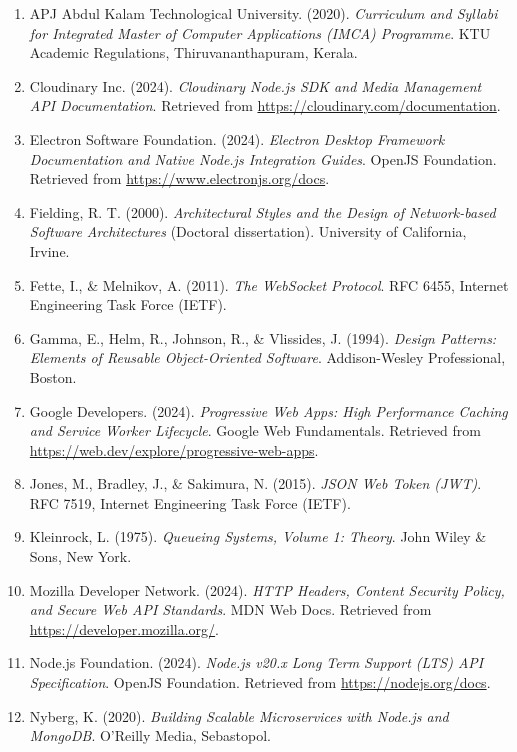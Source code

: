 \documentclass[12pt,a4paper,oneside]{report}
\begin{document}
\begin{singlespace}
\begin{enumerate}[leftmargin=0.35in, itemsep=6pt]
  \item APJ Abdul Kalam Technological University. (2020). \textit{Curriculum and Syllabi for Integrated Master of Computer Applications (IMCA) Programme}. KTU Academic Regulations, Thiruvananthapuram, Kerala.
  \item Cloudinary Inc. (2024). \textit{Cloudinary Node.js SDK and Media Management API Documentation}. Retrieved from \url{https://cloudinary.com/documentation}.
  \item Electron Software Foundation. (2024). \textit{Electron Desktop Framework Documentation and Native Node.js Integration Guides}. OpenJS Foundation. Retrieved from \url{https://www.electronjs.org/docs}.
  \item Fielding, R. T. (2000). \textit{Architectural Styles and the Design of Network-based Software Architectures} (Doctoral dissertation). University of California, Irvine.
  \item Fette, I., \& Melnikov, A. (2011). \textit{The WebSocket Protocol}. RFC 6455, Internet Engineering Task Force (IETF).
  \item Gamma, E., Helm, R., Johnson, R., \& Vlissides, J. (1994). \textit{Design Patterns: Elements of Reusable Object-Oriented Software}. Addison-Wesley Professional, Boston.
  \item Google Developers. (2024). \textit{Progressive Web Apps: High Performance Caching and Service Worker Lifecycle}. Google Web Fundamentals. Retrieved from \url{https://web.dev/explore/progressive-web-apps}.
  \item Jones, M., Bradley, J., \& Sakimura, N. (2015). \textit{JSON Web Token (JWT)}. RFC 7519, Internet Engineering Task Force (IETF).
  \item Kleinrock, L. (1975). \textit{Queueing Systems, Volume 1: Theory}. John Wiley \& Sons, New York.
  \item Mozilla Developer Network. (2024). \textit{HTTP Headers, Content Security Policy, and Secure Web API Standards}. MDN Web Docs. Retrieved from \url{https://developer.mozilla.org/}.
  \item Node.js Foundation. (2024). \textit{Node.js v20.x Long Term Support (LTS) API Specification}. OpenJS Foundation. Retrieved from \url{https://nodejs.org/docs}.
  \item Nyberg, K. (2020). \textit{Building Scalable Microservices with Node.js and MongoDB}. O'Reilly Media, Sebastopol.

\end{enumerate}
\end{singlespace}
\end{document}
